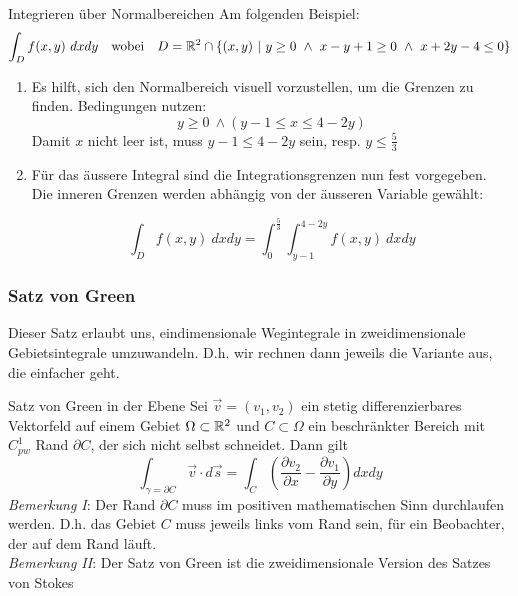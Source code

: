 \begin{Rezept}{Integrieren über Normalbereichen}{}
Am folgenden Beispiel:
\[ \int_D f(x, y) ~ dx dy ~~ \text{ wobei } ~~ D = \mathbb{R}^2 \cap \{(x, y) ~ | ~ y \geq 0 ~ \wedge ~ x-y+1\geq 0 ~ \wedge ~ x+2y-4 \leq 0\}\]
\begin{enumerate}
\item {
Es hilft, sich den Normalbereich visuell vorzustellen, um die Grenzen
zu finden. Bedingungen nutzen:
\[ y \geq 0 ~ \wedge (y-1 \leq x \leq 4-2y) \]
Damit $x$ nicht leer ist, muss $y-1 \leq 4-2y$ sein, resp. $y \leq \frac{5}{3}$ 
}
\item {
Für das äussere Integral sind die Integrationsgrenzen nun fest vorgegeben. Die inneren Grenzen
werden abhängig von der äusseren Variable gewählt:

\[ \int_D f(x,y) ~ dx dy = \int_0^{\frac{5}{3}} \int_{y-1}^{4-2y} f(x,y) ~ dx dy \]

}
\end{enumerate}
\end{Rezept}

\subsubsection{Satz von Green}

Dieser Satz erlaubt uns, eindimensionale Wegintegrale in zweidimensionale Gebietsintegrale umzuwandeln. D.h. wir rechnen dann jeweils die Variante aus, die einfacher geht.

\begin{Satz}{Satz von Green in der Ebene}{}
	Sei $\vec{v} = (v_1, v_2)$ ein stetig differenzierbares Vektorfeld auf einem Gebiet $\Omega \subset \mathbb{R}^2$ und $C \subset \Omega$ ein beschränkter Bereich mit $C^1_{pw}$ Rand $\partial C$, der sich nicht selbst schneidet. Dann gilt
	\[
		\int_{\gamma=\partial C} \vec{v} \cdot d\vec{s} = 
		\int_C \left(\frac{\partial v_2}{\partial x} - \frac{\partial v_1}{\partial y}\right) dxdy
	\]
	\textit{Bemerkung I}: Der Rand $\partial C$ muss im positiven mathematischen Sinn durchlaufen werden. D.h. das Gebiet $C$ muss jeweils links vom Rand sein, für ein Beobachter, der auf dem Rand läuft.\\
	
	\textit{Bemerkung II}: Der Satz von Green ist die zweidimensionale Version des Satzes von Stokes
\end{Satz}

